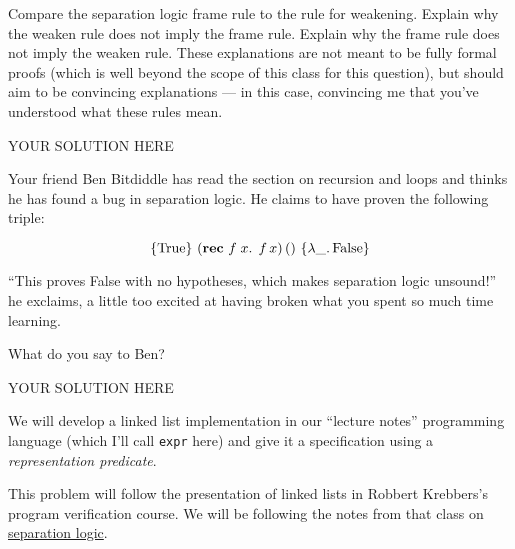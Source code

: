 \documentclass[11pt,twoside]{exam}
\def\fun#1{\lambda #1.\,}
\def\rec#1#2{\text{\textbf{rec} } #1 \; #2.\;\,}
\def\False{\mathrm{False}}
\def\True{\mathrm{True}}
\def\hoare#1#2#3{\left\{#1\right\} \, #2 \, \left\{#3\right\}}
\begin{document}
\begin{questions}
\question
Compare the separation logic frame rule to the rule for weakening. Explain why the weaken rule does not imply the frame rule. Explain why the frame rule does not imply the weaken rule. These explanations are not meant to be fully formal proofs (which is well beyond the scope of this class for this question), but should aim to be convincing explanations --- in this case, convincing me that you've understood what these rules mean.

\begin{solution}
  YOUR SOLUTION HERE
\end{solution}

\question
Your friend Ben Bitdiddle has read the section on recursion and loops and thinks he has found a bug in separation logic. He claims to have proven the following triple:

\[
  \hoare{\True}{(\rec{f}{x} f \, x) \, ()}{\fun{\_} \False}
\]

``This proves False with no hypotheses, which makes separation logic unsound!'' he exclaims, a little too excited at having broken what you spent so much time learning.

What do you say to Ben?

\begin{solution}
  YOUR SOLUTION HERE
\end{solution}

\question

We will develop a linked list implementation in our ``lecture notes'' programming language (which I'll call \texttt{expr} here) and give it a specification using a \emph{representation predicate}.

This problem will follow the presentation of linked lists in Robbert Krebbers's
program verification course. We will be following the notes from that class on
\href{https://gitlab.science.ru.nl/program-verification/course-2023-2024/-/blob/master/lectures/week10.md}{separation
logic}.

\end{questions}
\end{document}
